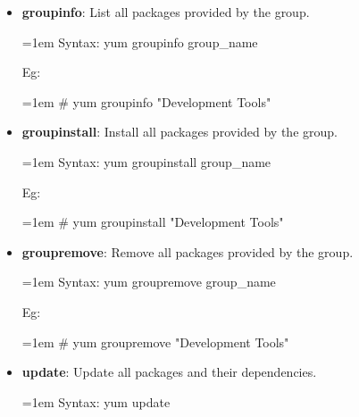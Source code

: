 \begin{flushleft}
\begin{itemize}
		\item \textbf{groupinfo}: List all packages provided by the group.
		\begin{tcolorbox}[breakable,notitle,boxrule=-0pt,colback=pink,colframe=pink]
			\color{black}
			\font=1em
			Syntax: yum groupinfo group\_name 
			\font=4pt
		\end{tcolorbox}
		Eg:
		\begin{tcolorbox}[breakable,notitle,boxrule=-0pt,colback=black,colframe=black]
			\color{green}
			\font=1em
			\# yum groupinfo "Development Tools"
			\font=4pt
		\end{tcolorbox}
		\bigskip
		\bigskip	

		\item \textbf{groupinstall}: Install all packages provided by the group.
		\begin{tcolorbox}[breakable,notitle,boxrule=-0pt,colback=pink,colframe=pink]
			\color{black}
			\font=1em
			Syntax: yum groupinstall group\_name 
			\font=4pt
		\end{tcolorbox}
		Eg:
		\begin{tcolorbox}[breakable,notitle,boxrule=-0pt,colback=black,colframe=black]
			\color{green}
			\font=1em
			\# yum groupinstall "Development Tools"
			\font=4pt
		\end{tcolorbox}
		\bigskip
		\bigskip	

		\item \textbf{groupremove}: Remove all packages provided by the group.
		\begin{tcolorbox}[breakable,notitle,boxrule=-0pt,colback=pink,colframe=pink]
			\color{black}
			\font=1em
			Syntax: yum groupremove group\_name 
			\font=4pt
		\end{tcolorbox}
		Eg:
		\begin{tcolorbox}[breakable,notitle,boxrule=-0pt,colback=black,colframe=black]
			\color{green}
			\font=1em
			\# yum groupremove "Development Tools"
			\font=4pt
		\end{tcolorbox}
		\bigskip
		\bigskip	


		\item \textbf{update}: Update all packages and their dependencies.
		\begin{tcolorbox}[breakable,notitle,boxrule=-0pt,colback=pink,colframe=pink]
			\color{black}
			\font=1em
			Syntax: yum update
			\font=4pt
		\end{tcolorbox}
		\bigskip
		\bigskip	


\end{itemize}
\end{flushleft}
